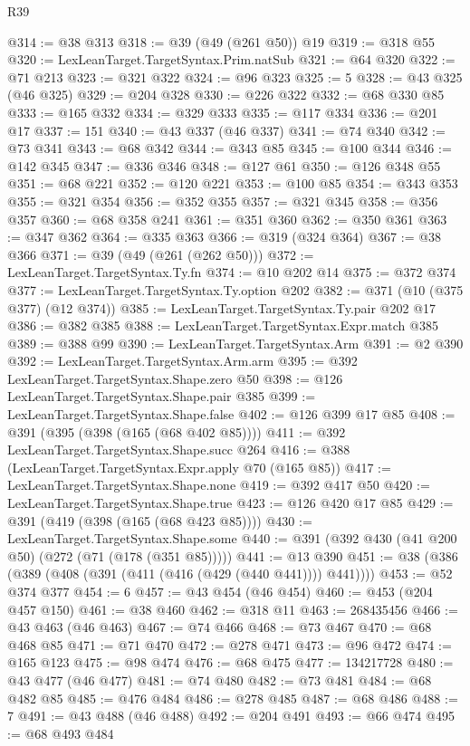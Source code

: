 \begin{lexlean}{R39}
\begin{coremodule}
@314 := @38 @313
@318 := @39 (@49 (@261 @50)) @19
@319 := @318 @55
@320 := LexLeanTarget.TargetSyntax.Prim.natSub
@321 := @64 @320
@322 := @71 @213
@323 := @321 @322
@324 := @96 @323
@325 := 5
@328 := @43 @325 (@46 @325)
@329 := @204 @328
@330 := @226 @322
@332 := @68 @330 @85
@333 := @165 @332
@334 := @329 @333
@335 := @117 @334
@336 := @201 @17
@337 := 151
@340 := @43 @337 (@46 @337)
@341 := @74 @340
@342 := @73 @341
@343 := @68 @342
@344 := @343 @85
@345 := @100 @344
@346 := @142 @345
@347 := @336 @346
@348 := @127 @61
@350 := @126 @348 @55
@351 := @68 @221
@352 := @120 @221
@353 := @100 @85
@354 := @343 @353
@355 := @321 @354
@356 := @352 @355
@357 := @321 @345
@358 := @356 @357
@360 := @68 @358 @241
@361 := @351 @360
@362 := @350 @361
@363 := @347 @362
@364 := @335 @363
@366 := @319 (@324 @364)
@367 := @38 @366
@371 := @39 (@49 (@261 (@262 @50)))
@372 := LexLeanTarget.TargetSyntax.Ty.fn
@374 := @10 @202 @14
@375 := @372 @374
@377 := LexLeanTarget.TargetSyntax.Ty.option @202
@382 := @371 (@10 (@375 @377) (@12 @374))
@385 := LexLeanTarget.TargetSyntax.Ty.pair @202 @17
@386 := @382 @385
@388 := LexLeanTarget.TargetSyntax.Expr.match @385
@389 := @388 @99
@390 := LexLeanTarget.TargetSyntax.Arm
@391 := @2 @390
@392 := LexLeanTarget.TargetSyntax.Arm.arm
@395 := @392 LexLeanTarget.TargetSyntax.Shape.zero @50
@398 := @126 LexLeanTarget.TargetSyntax.Shape.pair @385
@399 := LexLeanTarget.TargetSyntax.Shape.false
@402 := @126 @399 @17 @85
@408 := @391 (@395 (@398 (@165 (@68 @402 @85))))
@411 := @392 LexLeanTarget.TargetSyntax.Shape.succ @264
@416 := @388 (LexLeanTarget.TargetSyntax.Expr.apply @70 (@165 @85))
@417 := LexLeanTarget.TargetSyntax.Shape.none
@419 := @392 @417 @50
@420 := LexLeanTarget.TargetSyntax.Shape.true
@423 := @126 @420 @17 @85
@429 := @391 (@419 (@398 (@165 (@68 @423 @85))))
@430 := LexLeanTarget.TargetSyntax.Shape.some
@440 := @391 (@392 @430 (@41 @200 @50) (@272 (@71 (@178 (@351 @85)))))
@441 := @13 @390
@451 := @38 (@386 (@389 (@408 (@391 (@411 (@416 (@429 (@440 @441)))) @441))))
@453 := @52 @374 @377
@454 := 6
@457 := @43 @454 (@46 @454)
@460 := @453 (@204 @457 @150)
@461 := @38 @460
@462 := @318 @11
@463 := 268435456
@466 := @43 @463 (@46 @463)
@467 := @74 @466
@468 := @73 @467
@470 := @68 @468 @85
@471 := @71 @470
@472 := @278 @471
@473 := @96 @472
@474 := @165 @123
@475 := @98 @474
@476 := @68 @475
@477 := 134217728
@480 := @43 @477 (@46 @477)
@481 := @74 @480
@482 := @73 @481
@484 := @68 @482 @85
@485 := @476 @484
@486 := @278 @485
@487 := @68 @486
@488 := 7
@491 := @43 @488 (@46 @488)
@492 := @204 @491
@493 := @66 @474
@495 := @68 @493 @484

\end{coremodule}
\end{lexlean}
